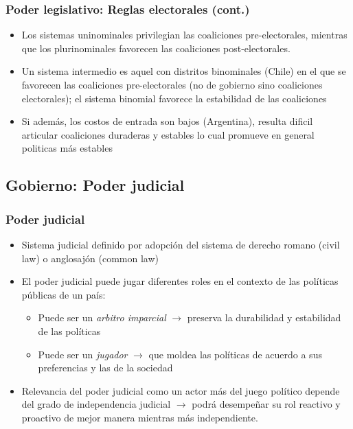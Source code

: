 \documentclass[14pt,aspectratio=169]{beamer}
\begin{document}
  \begin{frame}\frametitle{Poder legislativo: Reglas electorales (cont.)}
    \begin{itemize}
    \item Los sistemas uninominales privilegian las coaliciones
      pre-electorales, mientras que los plurinominales favorecen las
      coaliciones post-electorales.
      \item Un sistema intermedio es aquel con distritos binominales
        (Chile) en el que se favorecen las coaliciones pre-electorales
        (no de gobierno sino coaliciones electorales); el sistema
        binomial favorece la estabilidad de las coaliciones
        \item Si además, los costos de entrada son bajos (Argentina),
          resulta dificil articular coaliciones duraderas y estables
          lo cual promueve en general politicas más estables
    \end{itemize}
    \end{frame}


  \subsection{Gobierno: Poder judicial}

   \begin{frame}\frametitle{Poder judicial}
    \begin{itemize}
    \item Sistema judicial definido por
      adopción del sistema de derecho romano (civil law) o anglosajón
      (common law)
      \item El poder judicial puede jugar diferentes roles en el
        contexto de las políticas públicas de un país:
        \begin{itemize}
        \item Puede ser un \textit{arbitro imparcial}
          $\longrightarrow$ preserva la durabilidad y estabilidad de
          las políticas
          \item Puede ser un \textit{jugador} $\longrightarrow$ que
            moldea las políticas de acuerdo a sus preferencias y las
            de la sociedad
          \end{itemize}
          \item Relevancia del poder judicial como un actor más del
            juego político depende del grado de independencia judicial
            $\longrightarrow$ podrá desempeñar su rol reactivo y
            proactivo de mejor manera mientras más independiente.  
      \end{itemize}
    \end{frame}
    
\end{document}
